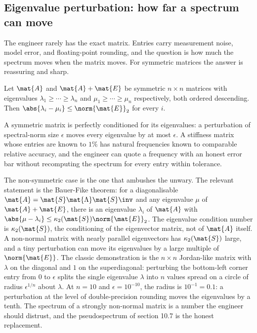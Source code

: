 \subsection{Eigenvalue perturbation: how far a spectrum can move}

The engineer rarely has the exact matrix. Entries carry measurement
noise, model error, and floating-point rounding, and the question is
how much the spectrum moves when the matrix moves. For symmetric
matrices the answer is reassuring and sharp.

\begin{principle}
Let $\mat{A}$ and $\mat{A} + \mat{E}$ be symmetric $n \times n$
matrices with eigenvalues $\lambda_{1} \geq \cdots \geq \lambda_{n}$
and $\mu_{1} \geq \cdots \geq \mu_{n}$ respectively, both ordered
descending. Then $\abs{\lambda_{i} - \mu_{i}} \leq
\norm{\mat{E}}_{2}$ for every $i$.
\end{principle}

A symmetric matrix is perfectly conditioned for its eigenvalues: a
perturbation of spectral-norm size $\epsilon$ moves every eigenvalue
by at most $\epsilon$. A stiffness matrix whose entries are known to
$1\%$ has natural frequencies known to comparable relative accuracy,
and the engineer can quote a frequency with an honest error bar
without recomputing the spectrum for every entry within tolerance.

The non-symmetric case is the one that ambushes the unwary. The
relevant statement is the Bauer-Fike theorem: for a diagonalisable
$\mat{A} = \mat{S} \mat{\Lambda} \mat{S}\inv$ and any eigenvalue
$\mu$ of $\mat{A} + \mat{E}$, there is an eigenvalue $\lambda_{i}$ of
$\mat{A}$ with $\abs{\mu - \lambda_{i}} \leq \kappa_{2}(\mat{S})
\norm{\mat{E}}_{2}$. The eigenvalue condition number is
$\kappa_{2}(\mat{S})$, the conditioning of the eigenvector matrix,
not of $\mat{A}$ itself. A non-normal matrix with nearly parallel
eigenvectors has $\kappa_{2}(\mat{S})$ large, and a tiny perturbation
can move its eigenvalues by a large multiple of $\norm{\mat{E}}$.
The classic demonstration is the $n \times n$ Jordan-like matrix with
$\lambda$ on the diagonal and $1$ on the superdiagonal: perturbing
the bottom-left corner entry from $0$ to $\epsilon$ splits the single
eigenvalue $\lambda$ into $n$ values spread on a circle of radius
$\epsilon^{1/n}$ about $\lambda$. At $n = 10$ and $\epsilon =
10^{-10}$, the radius is $10^{-1} = 0.1$: a perturbation at the level
of double-precision rounding moves the eigenvalues by a tenth. The
spectrum of a strongly non-normal matrix is a number the engineer
should distrust, and the pseudospectrum of section 10.7 is the
honest replacement.

